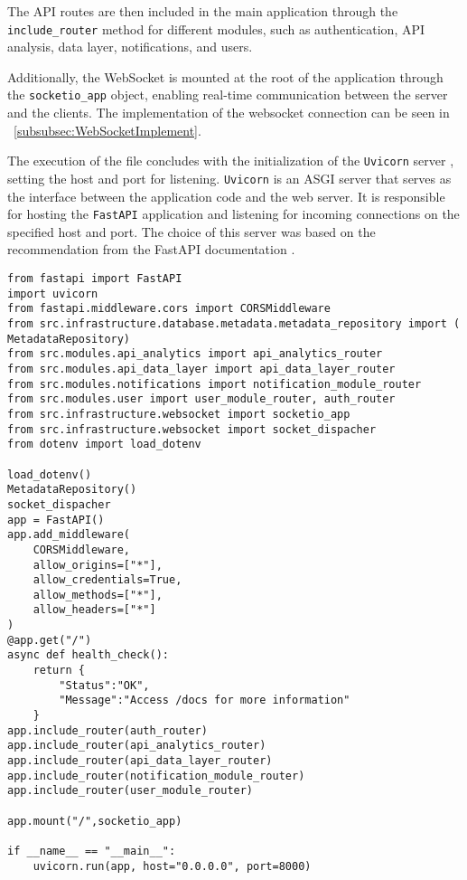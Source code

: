 The \gls{API} routes are then included in the main application through the \texttt{include\_router} method for different modules, such as authentication, API analysis, data layer, notifications, and users.

Additionally, the WebSocket is mounted at the root of the application through the \texttt{socketio\_app} object, enabling real-time communication between the server and the clients. The implementation of the websocket connection can be seen in ~\ref{subsubsec:WebSocketImplement}.

The execution of the file concludes with the initialization of the \texttt{Uvicorn} server \cite{uvicornOfficialDocs}, setting the host and port for listening. \texttt{Uvicorn} is an \gls{ASGI} server that serves as the interface between the application code and the web server. It is responsible for hosting the \texttt{FastAPI} application and listening for incoming connections on the specified host and port. The choice of this server was based on the recommendation from the FastAPI documentation \cite{fastapiTutorial}.

\begin{verbatim}
from fastapi import FastAPI
import uvicorn
from fastapi.middleware.cors import CORSMiddleware
from src.infrastructure.database.metadata.metadata_repository import (
MetadataRepository)
from src.modules.api_analytics import api_analytics_router
from src.modules.api_data_layer import api_data_layer_router
from src.modules.notifications import notification_module_router
from src.modules.user import user_module_router, auth_router
from src.infrastructure.websocket import socketio_app
from src.infrastructure.websocket import socket_dispacher
from dotenv import load_dotenv

load_dotenv()
MetadataRepository()
socket_dispacher
app = FastAPI()
app.add_middleware(
    CORSMiddleware,
    allow_origins=["*"],
    allow_credentials=True,
    allow_methods=["*"],
    allow_headers=["*"]
)
@app.get("/")
async def health_check():
    return {
        "Status":"OK",
        "Message":"Access /docs for more information"    
    }
app.include_router(auth_router)
app.include_router(api_analytics_router)
app.include_router(api_data_layer_router)
app.include_router(notification_module_router)
app.include_router(user_module_router)

app.mount("/",socketio_app)

if __name__ == "__main__":
    uvicorn.run(app, host="0.0.0.0", port=8000)
\end{verbatim}

